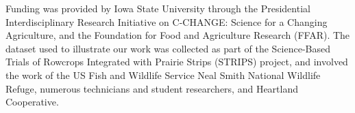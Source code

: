 
Funding was provided by Iowa State University through the Presidential
Interdisciplinary Research Initiative on C-CHANGE: Science for a
Changing Agriculture, and the Foundation for Food and Agriculture
Research (FFAR). The dataset used to illustrate our work was collected
as part of the Science-Based Trials of Rowcrops Integrated with
Prairie Strips (STRIPS) project, and involved the work of the US Fish
and Wildlife Service Neal Smith National Wildlife Refuge, numerous
technicians and student researchers, and Heartland Cooperative.


